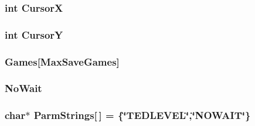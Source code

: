 \label{ID__US__1_8C_abf5358251c5b519d71e3d8bca8256510}
\hypertarget{ID__US__1_8C_af51730b2758fe5daa55ca8445a8f7c3b}{
\subsubsection[{CursorX}]{\setlength{\rightskip}{0pt plus 5cm}int {\bf CursorX}}}
\label{ID__US__1_8C_af51730b2758fe5daa55ca8445a8f7c3b}
\hypertarget{ID__US__1_8C_a7f5c998973d0526fcb8d52f37e5547da}{
\subsubsection[{CursorY}]{\setlength{\rightskip}{0pt plus 5cm}int {\bf CursorY}}}
\label{ID__US__1_8C_a7f5c998973d0526fcb8d52f37e5547da}
\hypertarget{ID__US__1_8C_a155f9931f0842c8f97f962eef9cd22f7}{
\subsubsection[{Games}]{ {\bf Games}\mbox{[}MaxSaveGames\mbox{]}}}
\label{ID__US__1_8C_a155f9931f0842c8f97f962eef9cd22f7}
\hypertarget{ID__US__1_8C_aac051dcdf0618ac25f7661d8c6ddd82c}{
\subsubsection[{NoWait}]{ {\bf NoWait}}}
\label{ID__US__1_8C_aac051dcdf0618ac25f7661d8c6ddd82c}
\hypertarget{ID__US__1_8C_af8599e1c1fbb3afabbdaa22e7c4a94b0}{
\subsubsection[{ParmStrings}]{\setlength{\rightskip}{0pt plus 5cm}char$\ast$ {\bf ParmStrings}\mbox{[}$\,$\mbox{]} = \{\char`\"{}TEDLEVEL\char`\"{},\char`\"{}NOWAIT\char`\"{}\}}}
\label{ID__US__1_8C_af8599e1c1fbb3afabbdaa22e7c4a94b0}
